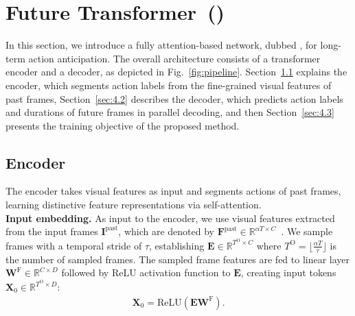 

\section{Future Transformer~(\ours)}
In this section, we introduce a fully attention-based network, dubbed \ours, for long-term action anticipation.
The overall architecture consists of a transformer encoder and a decoder, as depicted in Fig.~\ref{fig:pipeline}.
Section~\ref{sec:4.1} explains the encoder, which segments action labels from the fine-grained visual features of past frames, Section~\ref{sec:4.2} describes the decoder, which predicts action labels and durations of future frames in parallel decoding, and then Section~\ref{sec:4.3} presents the training objective of the proposed method.

\subsection{Encoder}
\label{sec:4.1}
The encoder takes visual features as input and segments actions of past frames, learning distinctive feature representations via self-attention.
\\
\noindent
\textbf{Input embedding.}
As input to the encoder, we use visual features extracted from the input frames $\bm{I}^{\mathrm{past}}$, which are denoted by $\bm{F}^{\mathrm{past}} \in \mathbb{R}^{\alpha T \times C}$~\cite{farha2020long,sener2020temporal}.
We sample frames with a temporal stride of $\tau$, establishing $\bm{E} \in \mathbb{R}^{T^\mathrm{O} \times C}$ where $T^\mathrm{O}= \lfloor \frac{\alpha T}{\tau} \rfloor$ is the number of sampled frames.
The sampled frame features are fed to linear layer $\bm{W}^\mathrm{F} \in \mathbb{R}^{C \times D}$ followed by ReLU activation function to $\bm{E}$, creating input tokens $\bm{X}_0 \in \mathbb{R}^{T^\mathrm{O} \times D}$:
\begin{align}
    \bm{X}_0 = \mathrm{ReLU}(\bm{E} \bm{W}^\mathrm{F}).
    \label{eq:1}
\end{align}

